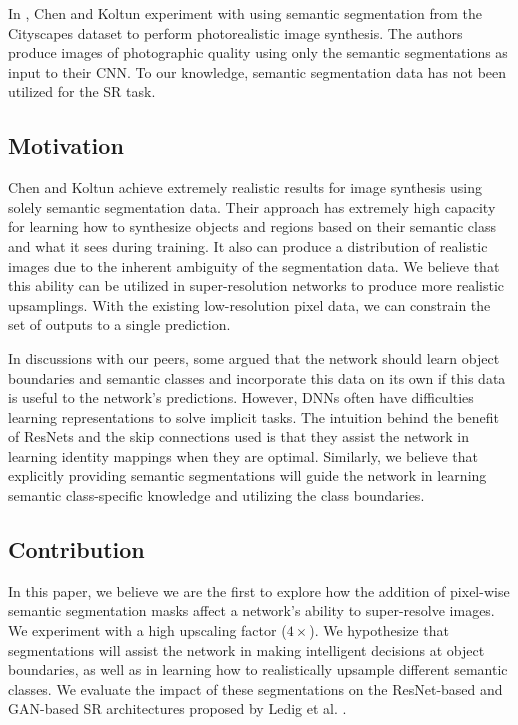 \documentclass[10pt,twocolumn,letterpaper]{article}
\begin{document}
In \cite{ImageSynthesis}, Chen and Koltun experiment with using semantic
segmentation from the Cityscapes dataset \cite{Cityscapes} to perform
photorealistic image synthesis. The authors produce images of photographic
quality using only the semantic segmentations as input to their CNN. To our
knowledge, semantic segmentation data has not been utilized for the SR task.

\subsection{Motivation}
Chen and Koltun achieve extremely realistic results for image synthesis using
solely semantic segmentation data. Their approach has extremely high capacity
for learning how to synthesize objects and regions based on their semantic
class and what it sees during training. It also can produce a distribution of
realistic images due to the inherent ambiguity of the segmentation data.  We
believe that this ability can be utilized in super-resolution networks to
produce more realistic upsamplings. With the existing low-resolution pixel
data, we can constrain the set of outputs to a single prediction.

In discussions with our peers, some argued that the network should learn object
boundaries and semantic classes and incorporate this data on its own if this
data is useful to the network's predictions. However, DNNs often have
difficulties learning representations to solve implicit tasks.  The intuition
behind the benefit of ResNets and the skip connections used is that they assist
the network in learning identity mappings when they are optimal.  Similarly, we
believe that explicitly providing semantic segmentations will guide the network
in learning semantic class-specific knowledge and utilizing the class
boundaries.

\subsection{Contribution}
In this paper, we believe we are the first to explore how the addition of
pixel-wise semantic segmentation masks affect a network's ability to
super-resolve images. We experiment with a high upscaling factor ($4 \times$).
We hypothesize that segmentations will assist the network in making intelligent
decisions at object boundaries, as well as in learning how to realistically
upsample different semantic classes. We evaluate the impact of these
segmentations on the ResNet-based and GAN-based SR architectures proposed by
Ledig et al. \cite{SRGAN}.
\end{document}
